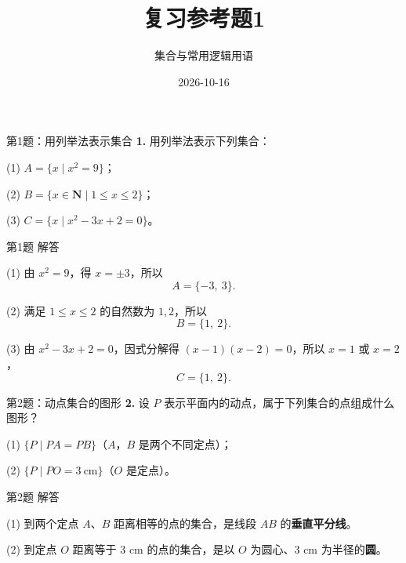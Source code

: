 \documentclass[10pt,aspectratio=169,serif]{beamer}
\title[复习参考题1]{复习参考题1}
\subtitle{集合与常用逻辑用语}
\author{}
\institute{}
\date{2026-10-16}
\begin{document}
\begin{frame}
  \titlepage
\end{frame}

\begin{frame}[t]{第1题：用列举法表示集合}
\textbf{1.} 用列举法表示下列集合：

\vspace{0.5em}
(1) $A = \{x \mid x^2 = 9\}$；

\vspace{0.3em}
(2) $B = \{x \in \mathbf{N} \mid 1 \le x \le 2\}$；

\vspace{0.3em}
(3) $C = \{x \mid x^2 - 3x + 2 = 0\}$。
\end{frame}

\begin{frame}[t]{第1题 解答}
\begin{tcolorbox}[colback=orange!10,colframe=orange,title=\textbf{解}]
(1) 由 $x^2 = 9$，得 $x = \pm 3$，所以
\[
A = \{-3,\ 3\}.
\]

\vspace{0.5em}
(2) 满足 $1 \le x \le 2$ 的自然数为 $1, 2$，所以
\[
B = \{1,\ 2\}.
\]

\vspace{0.5em}
(3) 由 $x^2 - 3x + 2 = 0$，因式分解得 $(x-1)(x-2) = 0$，所以 $x = 1$ 或 $x = 2$，
\[
C = \{1,\ 2\}.
\]
\end{tcolorbox}
\end{frame}

\begin{frame}[t]{第2题：动点集合的图形}
\textbf{2.} 设 $P$ 表示平面内的动点，属于下列集合的点组成什么图形？

\vspace{0.5em}
(1) $\{P \mid PA = PB\}$（$A$，$B$ 是两个不同定点）；

\vspace{0.3em}
(2) $\{P \mid PO = 3\ \text{cm}\}$（$O$ 是定点）。
\end{frame}

\begin{frame}[t]{第2题 解答}
\begin{tcolorbox}[colback=orange!10,colframe=orange,title=\textbf{解}]
(1) 到两个定点 $A$、$B$ 距离相等的点的集合，是线段 $AB$ 的\textbf{垂直平分线}。

\vspace{0.8em}
(2) 到定点 $O$ 距离等于 $3$ cm 的点的集合，是以 $O$ 为圆心、$3$ cm 为半径的\textbf{圆}。
\end{tcolorbox}
\end{frame}
\end{document}
